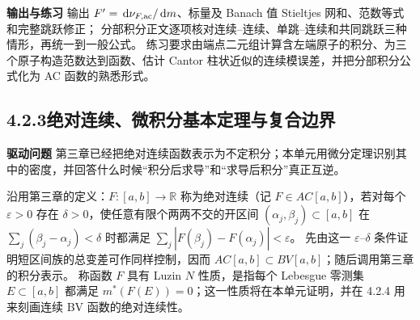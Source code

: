 \documentclass[11pt,a4paper]{ctexart}
\newcommand{\R}{\mathbb R}
\newcommand{\dd}{\,\mathrm d}
\newcommand{\planitem}[1]{\par\smallskip\noindent\textcolor{deepblue}{\textbf{#1}}\quad}
\newcommand{\unithead}[2]{\subsection{#1\quad #2}}
\begin{document}
\planitem{输出与练习}
输出 $F'=\dd\nu_{F,\rm ac}/\dd m$、标量及 Banach 值 Stieltjes 网和、范数等式和完整跳跃修正；
分部积分正文逐项核对连续--连续、单跳--连续和共同跳跃三种情形，再统一到一般公式。
练习要求由端点二元组计算含左端原子的积分、为三个原子构造范数达到函数、估计 Cantor
柱状近似的连续模误差，并把分部积分公式化为 AC 函数的熟悉形式。

\unithead{4.2.3}{绝对连续、微积分基本定理与复合边界}

\planitem{驱动问题}
第三章已经把绝对连续函数表示为不定积分；本单元用微分定理识别其中的密度，并回答什么时候“积分后求导”和“求导后积分”真正互逆。

沿用第三章的定义：$F:[a,b]\to\R$ 称为绝对连续（记 $F\in AC[a,b]$），若对每个
$\varepsilon>0$ 存在 $\delta>0$，使任意有限个两两不交的开区间
$(\alpha_j,\beta_j)\subset[a,b]$ 在
$\sum_j(\beta_j-\alpha_j)<\delta$ 时都满足
$\sum_j|F(\beta_j)-F(\alpha_j)|<\varepsilon$。
先由这一 $\varepsilon$--$\delta$ 条件证明短区间族的总变差可作同样控制，因而
$AC[a,b]\subset BV[a,b]$；随后调用第三章的积分表示。
称函数 $F$ 具有 Luzin $N$ 性质，是指每个 Lebesgue 零测集
$E\subset[a,b]$ 都满足 $m^*(F(E))=0$；这一性质将在本单元证明，并在
4.2.4 用来刻画连续 BV 函数的绝对连续性。
\end{document}
